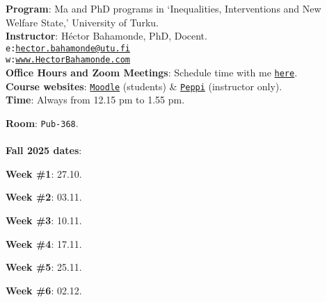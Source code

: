 \documentclass[letterpaper]{article}
\renewenvironment{itemize}{
  \begin{list}{}{
    \setlength{\leftmargin}{1.5em}
  }
}{
  \end{list}
}
\begin{document}
\vspace{1mm}
{\bf Program}: Ma and PhD programs in `Inequalities, Interventions and New Welfare State,' University of Turku.\\
{\bf Instructor}: H\'ector Bahamonde, PhD, Docent.\\
\texttt{e:}\href{mailto:hector.bahamonde@utu.fi}{\texttt{hector.bahamonde@utu.fi}}\\
\texttt{w:}\href{http://www.hectorbahamonde.com}{\texttt{www.HectorBahamonde.com}}\\
{\bf Office Hours and Zoom Meetings}: Schedule time with me \href{https://calendly.com/bahamonde}{\texttt{here}}.\\
{\bf Course websites}: \href{https://moodle.utu.fi/course/view.php?id=33451}{\texttt{Moodle}} (students) \& \href{https://planner.peppi.utu.fi/group/opettajan-tyopoyta/toteutusten-hallinta?p_p_id=RealizationPortlet_WAR_realizationportlet&p_p_lifecycle=0&p_p_state=normal&p_p_mode=view&_RealizationPortlet_WAR_realizationportlet_struts.portlet.action=%2Frealization%2Fbasic&realization.realizationId=45184}{\texttt{Peppi}} (instructor only).\\
{\bf Time}: Always from 12.15 pm to 1.55 pm.




{\bf Room}: \texttt{Pub-368}.\\
\\
{\bf Fall 2025 dates}:

\begin{itemize}

\item {\bf Week \#1}: 27.10.
\item {\bf Week \#2}: 03.11.
\item {\bf Week \#3}: 10.11.
\item {\bf Week \#4}: 17.11.
\item {\bf Week \#5}: 25.11.
\item {\bf Week \#6}: 02.12.

\end{itemize}


\end{document}
